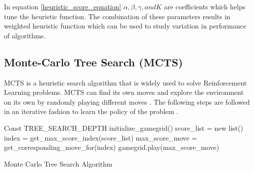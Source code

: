 \documentclass{svproc}
\begin{document}
    In equation \ref{heuristic_score_equation} \(\alpha ,  \beta , \gamma , and K \) are coefficients which helps tune the heuristic function. The combination of these parameters results in weighted heuristic function which can be used to study variation in performance of algorithms.

    \subsection{Monte-Carlo Tree Search (MCTS)}
    
    MCTS is a heuristic search algorithm that is widely used to solve Reinforcement Learning problems. MCTS can find its own moves and explore the environment on its own by randomly playing different moves \cite{mcts_comparison}. The following steps are followed in an iterative fashion to learn the policy of the problem \cite{mcts_medium}.
    
    \begin{algorithm}[t]
        \SetAlgoLined
        Const TREE\_SEARCH\_DEPTH\;
        initialize\_gamegrid()\;
         {
            score\_list = new list()\;
            index =  get\_max\_score\_index(score\_list)\;
            max\_score\_move = get\_corresponding\_move\_for(index)\;
            gamegrid.play(max\_score\_move)\;
        }
        \caption{Monte Carlo Tree Search Algorithm}
    \end{algorithm}
    
\end{document}
